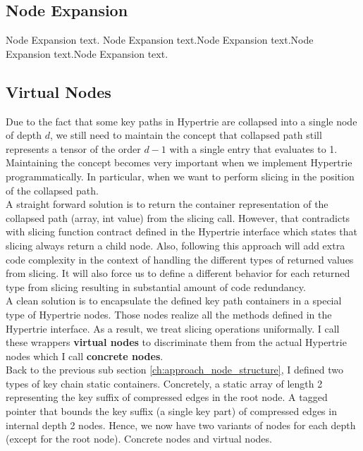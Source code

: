 \subsection{Node Expansion}
Node Expansion text. Node Expansion text.Node Expansion text.Node Expansion text.Node Expansion text.

\subsection{Virtual Nodes}
Due to the fact that some key paths in Hypertrie are collapsed into a single node of depth $d$, we still need to maintain the concept that collapsed path still represents a tensor of the order $d-1$ with a single entry that evaluates to 1. Maintaining the concept becomes very important when we implement Hypertrie programmatically. In particular, when we want to perform slicing in the position of the collapsed path. \\

A straight forward solution is to return the container representation of the collapsed path (array, int value) from the slicing call. However, that contradicts with slicing function contract defined in the Hypertrie interface which states that slicing always return a child node. Also, following this approach will add extra code complexity in the context of handling the different types of returned values from slicing. It will also force us to define a different behavior for each returned type from slicing resulting in substantial amount of code redundancy.  \\

A clean solution is to encapsulate the defined key path containers in a special type of Hypertrie nodes. 
Those nodes realize all the methods defined in the Hypertrie interface. 
As a result, we treat slicing operations uniformally. 
I call these wrappers \textbf{virtual nodes} to discriminate them from the actual Hypertrie nodes which I call \textbf{concrete nodes}. \\

Back to the previous sub section \ref{ch:approach_node_structure}, I defined two types of key chain static containers. 
Concretely, a static array of length 2 representing the key suffix of compressed edges in the root node. 
A tagged pointer that bounds the key suffix (a single key part) of compressed edges in internal depth 2 nodes. 
Hence, we now have two variants of nodes for each depth (except for the root node). Concrete nodes and virtual nodes. \\

